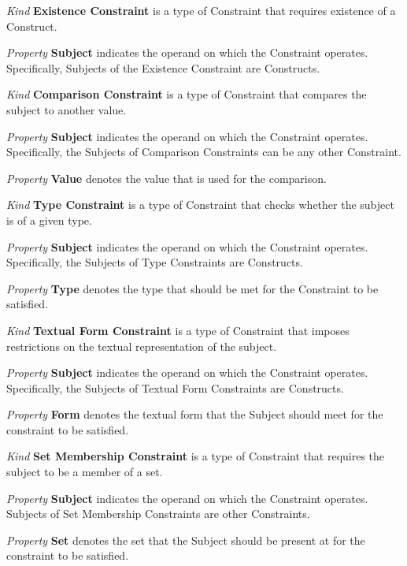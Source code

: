 \documentclass[parskip=full]{uvamscse}
\begin{document}
\begin{description}
\item\textit{Kind} \textbf{Existence Constraint} is a type of Constraint that requires existence of a Construct. 

\textit{Property} \textbf{Subject} indicates the operand on which the Constraint operates. Specifically, Subjects of the Existence Constraint are Constructs.


\item\textit{Kind} \textbf{Comparison Constraint} is a type of Constraint that compares the subject to another value.

\textit{Property} \textbf{Subject} indicates the operand on which the Constraint operates. Specifically, the Subjects of Comparison Constraints can be any other Constraint.

\textit{Property} \textbf{Value} denotes the value that is used for the comparison.


\item\textit{Kind} \textbf{Type Constraint} is a type of Constraint that checks whether the subject is of a given type.

\textit{Property} \textbf{Subject} indicates the operand on which the Constraint operates. Specifically, the Subjects of Type Constraints are Constructs.

\textit{Property} \textbf{Type} denotes the type that should be met for the Constraint to be satisfied.


\item\textit{Kind} \textbf{Textual Form Constraint} is a type of Constraint that imposes restrictions on the textual representation of the subject.

\textit{Property} \textbf{Subject} indicates the operand on which the Constraint operates. Specifically, the Subjects of Textual Form Constraints are Constructs. 

\textit{Property} \textbf{Form} denotes the textual form that the Subject should meet for the constraint to be satisfied.


\item\textit{Kind} \textbf{Set Membership Constraint} is a type of Constraint that requires the subject to be a member of a set.

\textit{Property} \textbf{Subject} indicates the operand on which the Constraint operates. Subjects of Set Membership Constraints are other Constraints.

\textit{Property} \textbf{Set} denotes the set that the Subject should be present at for the constraint to be satisfied.



\end{description}
\end{document}
